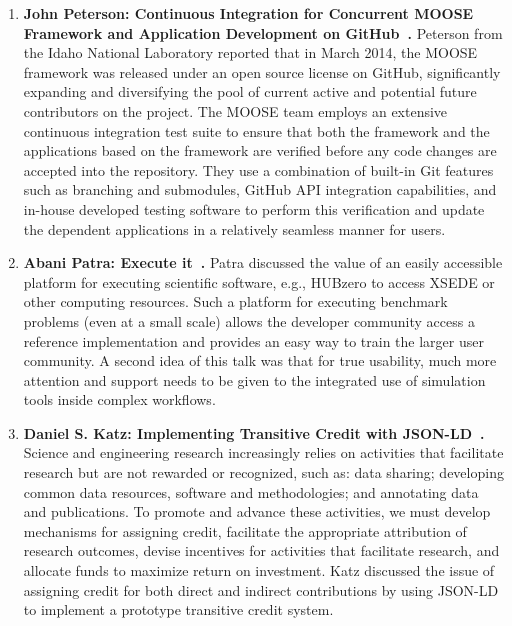 \documentclass[11pt, oneside]{amsart}
\begin{document}
\begin{enumerate}
\item \textbf{John Peterson: Continuous Integration for Concurrent MOOSE Framework
and Application Development on GitHub~\cite{Peterson_poster}.}
Peterson from the Idaho National Laboratory reported
that in March 2014, the MOOSE framework was released under an open source
license on GitHub, significantly expanding and diversifying the pool of current
active and potential future contributors on the project. The MOOSE team employs
an extensive continuous integration test suite to ensure that both the framework
and the applications based on the framework are verified before any code changes
are accepted into the repository. They use a combination of built-in Git
features such as branching and submodules, GitHub API integration capabilities,
and in-house developed testing software to perform this verification and update
the dependent applications in a relatively seamless manner for users.

\item \textbf{Abani Patra: Execute it~\cite{Patra_poster}.}
Patra discussed the value of an easily accessible platform for
executing scientific software, e.g., HUBzero to access XSEDE or other computing
resources. Such a platform for executing benchmark problems (even at a small
scale) allows the developer community access a reference implementation and
provides an easy way to train the larger user community. A second idea of this
talk was that for true usability, much more attention and support needs
to be given to the integrated use of simulation tools inside complex workflows.


\item \textbf{Daniel S. Katz: Implementing Transitive Credit with
JSON-LD~\cite{Katz_transitive_credit_poster}.} Science and engineering research
increasingly relies on activities that facilitate research but are not rewarded
or recognized, such as: data sharing; developing common data resources, software
and methodologies; and annotating data and publications. To promote and advance
these activities, we must develop mechanisms for assigning credit, facilitate
the appropriate attribution of research outcomes, devise incentives for
activities that facilitate research, and allocate funds to maximize return on
investment. Katz discussed the issue of assigning credit for both direct and
indirect contributions by using JSON-LD to implement a prototype transitive
credit system.


\end{enumerate}
\end{document}
